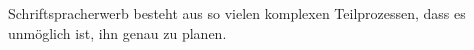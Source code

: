 Schriftspracherwerb besteht aus so vielen komplexen Teilprozessen, dass es unmöglich ist, ihn genau zu planen.